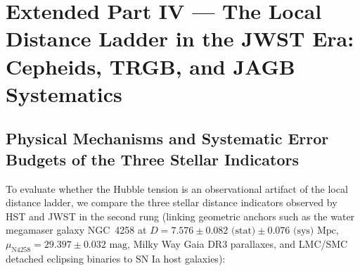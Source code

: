 \documentclass[aps,prd,preprint,superscriptaddress,nofootinbib]{revtex4-2}
\begin{document}
\section{Extended Part IV --- The Local Distance Ladder in the JWST Era: Cepheids, TRGB, and JAGB Systematics}

\subsection{Physical Mechanisms and Systematic Error Budgets of the Three Stellar Indicators}

To evaluate whether the Hubble tension is an observational artifact of the local distance ladder, we compare the three stellar distance indicators observed by HST and JWST in the second rung (linking geometric anchors such as the water megamaser galaxy NGC~4258 at $D = 7.576 \pm 0.082\text{ (stat)} \pm 0.076\text{ (sys)}\text{ Mpc}$, $\mu_{\text{N4258}} = 29.397 \pm 0.032\text{ mag}$, Milky Way Gaia DR3 parallaxes, and LMC/SMC detached eclipsing binaries to SN Ia host galaxies):
\end{document}
